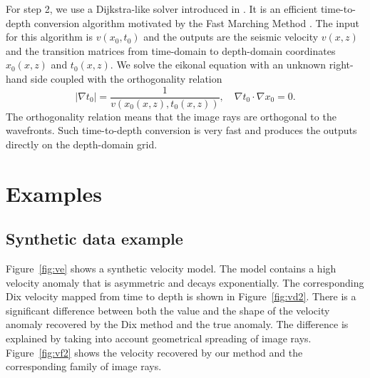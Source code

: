 For step 2, we use a Dijkstra-like solver introduced in \cite{cfs}.
It is an efficient time-to-depth conversion algorithm motivated by
the Fast Marching Method \cite[]{Sethian1996}.  
The input for this algorithm 
is $v(x_0,t_0)$ and the outputs are 
the seismic velocity $v(x,z)$ and the transition matrices from time-domain 
to depth-domain coordinates $x_0(x,z)$ and $t_0(x,z)$. We solve the
eikonal equation with an unknown right-hand side coupled
with the orthogonality relation
\begin{equation}
\label{t2d_system}
|\nabla t_0|=\frac{1}{v(x_0(x,z),t_0(x,z))},\quad \nabla t_0\cdot\nabla x_0=0.
\end{equation}
The orthogonality relation means that the image rays are orthogonal to
the wavefronts.  Such time-to-depth conversion is very fast and
produces the outputs directly on the depth-domain grid.


\section{Examples}

\subsection{Synthetic data example}


Figure~\ref{fig:ve} shows a synthetic velocity model. The model
contains a high velocity anomaly that is asymmetric and decays
exponentially. The corresponding Dix velocity mapped from time to
depth is shown in Figure~\ref{fig:vd2}. There is a significant
difference between both the value and the shape of the velocity
anomaly recovered by the Dix method and the true anomaly. The
difference is explained by taking into account geometrical spreading
of image rays. Figure~\ref{fig:vf2} shows the velocity recovered by our
method and the corresponding family of image rays. 


